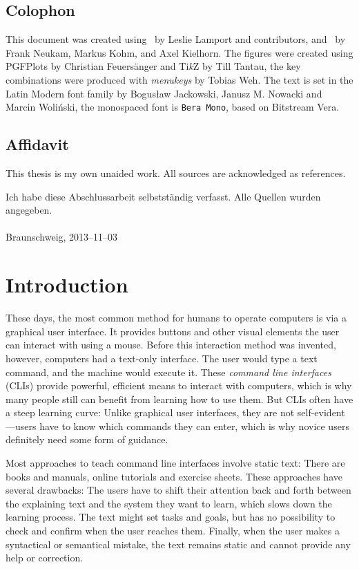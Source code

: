 \documentclass[paper=a4,twoside,abstract=on,cleardoublepage=empty,numbers=noenddot,toc=bib,12pt,appendixprefix=true]{scrreprt}
\begin{document}
\section*{Colophon}

This document was created using \LaTeXe\ by Leslie Lamport and contributors, and \KOMAScript\ by Frank Neukam, Markus Kohm, and Axel Kielhorn. The figures were created using PGFPlots by Christian Feuersänger and Ti\textit{k}Z by Till Tantau, the key combinations were produced with \emph{menukeys} by Tobias Weh. The text is set in the Latin Modern font family by Bogusław Jackowski, Janusz M. Nowacki and Marcin Woliński, the monospaced font is \texttt{Bera Mono}, based on Bitstream Vera.

\section*{Affidavit}

This thesis is my own unaided work. All sources are acknowledged as references.

\noindent
Ich habe diese Abschlussarbeit selbstständig verfasst. Alle Quellen wurden angegeben.
\\\\
\vskip 5mm
Braunschweig, 2013--11--03
\hskip 1cm \dotfill

\setcounter{tocdepth}{2}
\tableofcontents

\chapter{Introduction}

These days, the most common method for humans to operate computers is via a graphical user interface. It provides buttons and other visual elements the user can interact with using a mouse. Before this interaction method was invented, however, computers had a text-only interface. The user would type a text command, and the machine would execute it. These \emph{command line interfaces} (CLIs) provide powerful, efficient means to interact with computers, which is why many people still can benefit from learning how to use them. But CLIs often have a steep learning curve: Unlike graphical user interfaces, they are not self-evident---users have to know which commands they can enter, which is why novice users definitely need some form of guidance.

Most approaches to teach command line interfaces involve static text: There are books and manuals, online tutorials and exercise sheets. These approaches have several drawbacks: The users have to shift their attention back and forth between the explaining text and the system they want to learn, which slows down the learning process. The text might set tasks and goals, but has no possibility to check and confirm when the user reaches them. Finally, when the user makes a syntactical or semantical mistake, the text remains static and cannot provide any help or correction.
\end{document}
